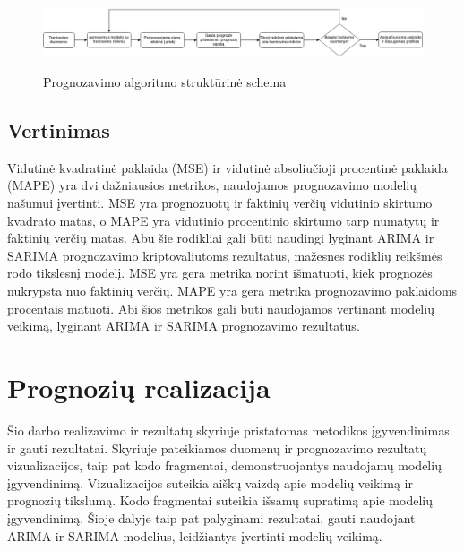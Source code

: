 \documentclass{VUMIFInfKursinis}
\begin{document}
\begin{figure}[H]
  \centering
  \includegraphics[width=.75\textwidth]{img/main_algo_flowchart.png}
  \label{fig:forecast_inner_flowchart}
  \caption{Prognozavimo algoritmo struktūrinė schema}
\end{figure}

\subsection{Vertinimas}

Vidutinė kvadratinė paklaida (MSE) ir vidutinė absoliučioji procentinė paklaida (MAPE) yra dvi dažniausios metrikos, naudojamos prognozavimo modelių našumui įvertinti.
MSE yra prognozuotų ir faktinių verčių vidutinio skirtumo kvadrato matas, o MAPE yra vidutinio procentinio skirtumo tarp numatytų ir faktinių verčių matas.
Abu šie rodikliai gali būti naudingi lyginant ARIMA ir SARIMA prognozavimo kriptovaliutoms rezultatus, mažesnes rodiklių reikšmės rodo tikslesnį modelį.
MSE yra gera metrika norint išmatuoti, kiek prognozės nukrypsta nuo faktinių verčių. MAPE yra gera metrika prognozavimo paklaidoms procentais matuoti.
Abi šios metrikos gali būti naudojamos vertinant modelių veikimą, lyginant ARIMA ir SARIMA prognozavimo rezultatus.


\section{Prognozių realizacija}
Šio darbo realizavimo ir rezultatų skyriuje pristatomas metodikos įgyvendinimas ir gauti rezultatai. 
Skyriuje pateikiamos duomenų ir prognozavimo rezultatų vizualizacijos, taip pat kodo fragmentai, demonstruojantys naudojamų modelių įgyvendinimą.
Vizualizacijos suteikia aiškų vaizdą apie modelių veikimą ir prognozių tikslumą. 
Kodo fragmentai suteikia išsamų supratimą apie modelių įgyvendinimą. 
Šioje dalyje taip pat palyginami rezultatai, gauti naudojant ARIMA ir SARIMA modelius, leidžiantys įvertinti modelių veikimą.
\end{document}
